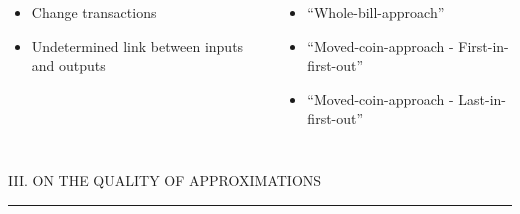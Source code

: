 \documentclass[final,hyperref={pdfpagelabels=false}]{beamer}
\begin{document}
\begin{frame}[t]
\begin{columns}
\begin{column}{.9\textwidth}
\begin{columns}[T]
  \smallskip{}

  \begin{itemize}
  \item Change transactions
  \item Undetermined link between inputs and outputs
  \end{itemize}

  \smallskip{}
  
  \begin{itemize}
  \item ``Whole-bill-approach'' 
  \item ``Moved-coin-approach - First-in-first-out''
  \item ``Moved-coin-approach - Last-in-first-out''
  \end{itemize}

  


\end{columns}

\vspace{1em}
{\Large III. ON THE QUALITY OF APPROXIMATIONS}\vspace{-1ex}
\textcolor{hublau}{\rule{\textwidth}{4pt}}\\[1ex]


\end{column}
\end{columns}
\end{frame}
\end{document}
